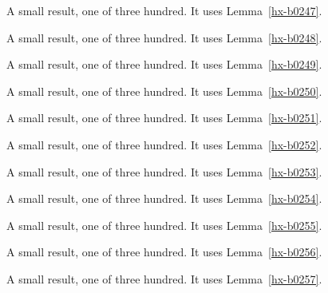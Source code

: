 \begin{lemma}[Bulk 248]\label{hx-b0248}
A small result, one of three hundred. It uses Lemma~\ref{hx-b0247}.
\end{lemma}

\begin{lemma}[Bulk 249]\label{hx-b0249}
A small result, one of three hundred. It uses Lemma~\ref{hx-b0248}.
\end{lemma}

\begin{lemma}[Bulk 250]\label{hx-b0250}
A small result, one of three hundred. It uses Lemma~\ref{hx-b0249}.
\end{lemma}

\begin{lemma}[Bulk 251]\label{hx-b0251}
A small result, one of three hundred. It uses Lemma~\ref{hx-b0250}.
\end{lemma}

\begin{lemma}[Bulk 252]\label{hx-b0252}
A small result, one of three hundred. It uses Lemma~\ref{hx-b0251}.
\end{lemma}

\begin{lemma}[Bulk 253]\label{hx-b0253}
A small result, one of three hundred. It uses Lemma~\ref{hx-b0252}.
\end{lemma}

\begin{lemma}[Bulk 254]\label{hx-b0254}
A small result, one of three hundred. It uses Lemma~\ref{hx-b0253}.
\end{lemma}

\begin{lemma}[Bulk 255]\label{hx-b0255}
A small result, one of three hundred. It uses Lemma~\ref{hx-b0254}.
\end{lemma}

\begin{lemma}[Bulk 256]\label{hx-b0256}
A small result, one of three hundred. It uses Lemma~\ref{hx-b0255}.
\end{lemma}

\begin{lemma}[Bulk 257]\label{hx-b0257}
A small result, one of three hundred. It uses Lemma~\ref{hx-b0256}.
\end{lemma}

\begin{lemma}[Bulk 258]\label{hx-b0258}
A small result, one of three hundred. It uses Lemma~\ref{hx-b0257}.
\end{lemma}

